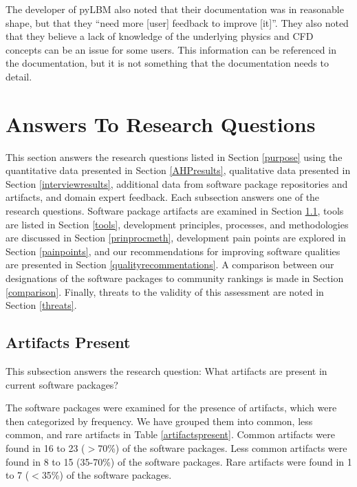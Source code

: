 \documentclass[12pt, notitlepage]{article}
\begin{document}
The developer of pyLBM also noted that their documentation was in reasonable shape, but that they ``need more [user] feedback to improve [it]''. They also noted that they believe a lack of knowledge of the underlying physics and CFD concepts can be an issue for some users. This information can be referenced in the documentation, but it is not something that the documentation needs to detail. 

\newpage


\section{Answers To Research Questions}\label{answersquestions}

This section answers the research questions listed in Section \ref{purpose} using the quantitative data presented in Section \ref{AHPresults}, qualitative data presented in Section \ref{interviewresults}, additional data from software package repositories and artifacts, and domain expert feedback. Each subsection answers one of the research questions. Software package artifacts are examined in Section \ref{artifacts}, tools are listed in Section \ref{tools}, development principles, processes, and methodologies are discussed in Section \ref{prinprocmeth}, development pain points are explored in Section \ref{painpoints}, and our recommendations for improving software qualities are presented in Section \ref{qualityrecommentations}. A comparison between our designations of the software packages to community rankings is made in Section \ref{comparison}. Finally, threats to the validity of this assessment are noted in Section \ref{threats}.

\subsection{Artifacts Present}\label{artifacts}

This subsection answers the research question: What artifacts are present in current software packages?

The software packages were examined for the presence of artifacts, which were then categorized by frequency. We have grouped them into common, less common, and rare artifacts in Table \ref{artifactspresent}. Common artifacts were found in 16 to 23 ($>$70\%) of the software packages. Less common artifacts were found in 8 to 15 (35-70\%) of the software packages. Rare artifacts were found in 1 to 7 ($<$35\%) of the software packages. 
\end{document}
